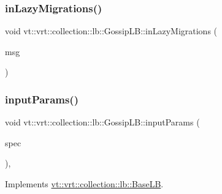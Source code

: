 \mbox{\label{structvt_1_1vrt_1_1collection_1_1lb_1_1_gossip_l_b_a2fa63a6d2dc211423423b0d7de1d1ed6}} 
\subsubsection{\texorpdfstring{in\+Lazy\+Migrations()}{inLazyMigrations()}}
{\footnotesize\ttfamily void vt\+::vrt\+::collection\+::lb\+::\+Gossip\+L\+B\+::in\+Lazy\+Migrations (\begin{DoxyParamCaption}\item[{\hyperlink{structvt_1_1vrt_1_1collection_1_1balance_1_1_lazy_migration_msg}{balance\+::\+Lazy\+Migration\+Msg} $\ast$}]{msg }\end{DoxyParamCaption})\hspace{0.3cm}{\ttfamily [protected]}}

\mbox{\label{structvt_1_1vrt_1_1collection_1_1lb_1_1_gossip_l_b_abc000890ad1743faae2fe853d73485bb}} 
\subsubsection{\texorpdfstring{input\+Params()}{inputParams()}}
{\footnotesize\ttfamily void vt\+::vrt\+::collection\+::lb\+::\+Gossip\+L\+B\+::input\+Params (\begin{DoxyParamCaption}\item[{\hyperlink{structvt_1_1vrt_1_1collection_1_1balance_1_1_spec_entry}{balance\+::\+Spec\+Entry} $\ast$}]{spec }\end{DoxyParamCaption})\hspace{0.3cm}{\ttfamily [override]}, {\ttfamily [virtual]}}



Implements \hyperlink{structvt_1_1vrt_1_1collection_1_1lb_1_1_base_l_b_a555e29aadfd428383464d6dd007506b6}{vt\+::vrt\+::collection\+::lb\+::\+Base\+LB}.

